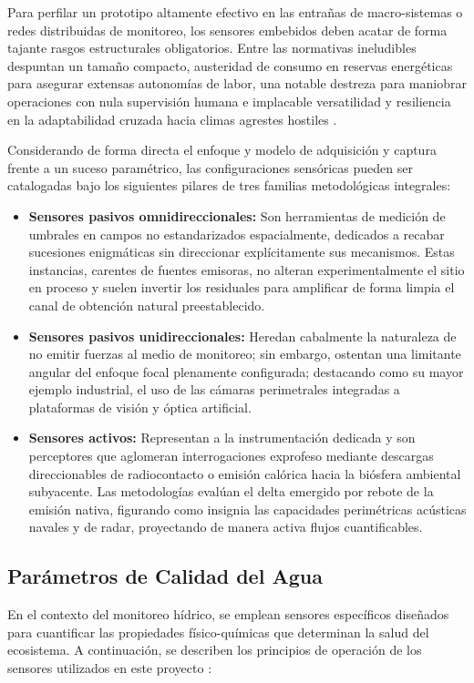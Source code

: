 Para perfilar un prototipo altamente efectivo en las entrañas de macro-sistemas o redes distribuidas de monitoreo, los sensores embebidos deben acatar de forma tajante rasgos estructurales obligatorios. Entre las normativas ineludibles despuntan un tamaño compacto, austeridad de consumo en reservas energéticas para asegurar extensas autonomías de labor, una notable destreza para maniobrar operaciones con nula supervisión humana e implacable versatilidad y resiliencia en la adaptabilidad cruzada hacia climas agrestes hostiles \cite{fernandez2009}.

Considerando de forma directa el enfoque y modelo de adquisición y captura frente a un suceso paramétrico, las configuraciones sensóricas pueden ser catalogadas bajo los siguientes pilares de tres familias metodológicas integrales:

\begin{itemize}
    \item \textbf{Sensores pasivos omnidireccionales:} Son herramientas de medición de umbrales en campos no estandarizados espacialmente, dedicados a recabar sucesiones enigmáticas sin direccionar explícitamente sus mecanismos. Estas instancias, carentes de fuentes emisoras, no alteran experimentalmente el sitio en proceso y suelen invertir los residuales para amplificar de forma limpia el canal de obtención natural preestablecido.
    \item \textbf{Sensores pasivos unidireccionales:} Heredan cabalmente la naturaleza de no emitir fuerzas al medio de monitoreo; sin embargo, ostentan una limitante angular del enfoque focal plenamente configurada; destacando como su mayor ejemplo industrial, el uso de las cámaras perimetrales integradas a plataformas de visión y óptica artificial.
    \item \textbf{Sensores activos:} Representan a la instrumentación dedicada y son perceptores que aglomeran interrogaciones exprofeso mediante descargas direccionables de radiocontacto o emisión calórica hacia la biósfera ambiental subyacente. Las metodologías evalúan el delta emergido por rebote de la emisión nativa, figurando como insignia las capacidades perimétricas acústicas navales y de radar, proyectando de manera activa flujos cuantificables.
\end{itemize}

\subsection{Parámetros de Calidad del Agua}
En el contexto del monitoreo hídrico, se emplean sensores específicos diseñados para cuantificar las propiedades físico-químicas que determinan la salud del ecosistema. A continuación, se describen los principios de operación de los sensores utilizados en este proyecto \cite{waterQualitySensors}:

